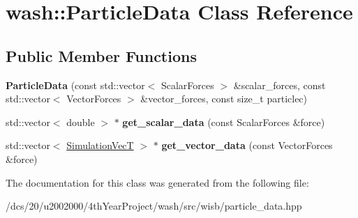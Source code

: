 \hypertarget{classwash_1_1ParticleData}{}\section{wash\+:\+:Particle\+Data Class Reference}
\label{classwash_1_1ParticleData}
\subsection*{Public Member Functions}
\begin{DoxyCompactItemize}
\item 
\mbox{\label{classwash_1_1ParticleData_ab656a0bcb4ac68ff6095e11a2e2d0c9d}} 
{\bfseries Particle\+Data} (const std\+::vector$<$ Scalar\+Forces $>$ \&scalar\+\_\+forces, const std\+::vector$<$ Vector\+Forces $>$ \&vector\+\_\+forces, const size\+\_\+t particlec)
\item 
\mbox{\label{classwash_1_1ParticleData_a160d426acd12c82b381269514948ccfa}} 
std\+::vector$<$ double $>$ $\ast$ {\bfseries get\+\_\+scalar\+\_\+data} (const Scalar\+Forces \&force)
\item 
\mbox{\label{classwash_1_1ParticleData_a9203f79e359fe1131e35f397d0ba9b4b}} 
std\+::vector$<$ \mbox{\hyperlink{classwash_1_1Vec}{Simulation\+VecT}} $>$ $\ast$ {\bfseries get\+\_\+vector\+\_\+data} (const Vector\+Forces \&force)
\end{DoxyCompactItemize}


The documentation for this class was generated from the following file\+:\begin{DoxyCompactItemize}
\item 
/dcs/20/u2002000/4th\+Year\+Project/wash/src/wisb/particle\+\_\+data.\+hpp\end{DoxyCompactItemize}
